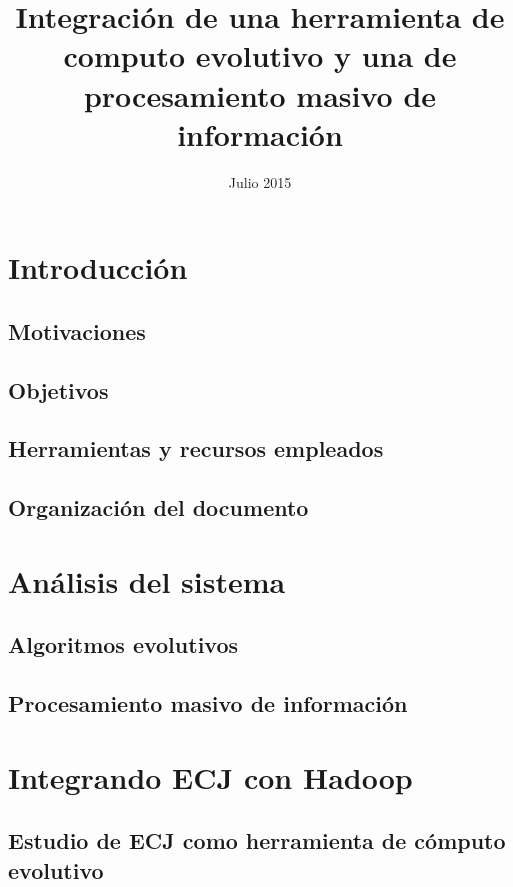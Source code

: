 \documentclass{estilos-y-libreria}
\title{Integración de una herramienta de computo evolutivo y una de procesamiento masivo de informaci\'on}
\date{Julio 2015}
\begin{document}
\frontmatter
\hacerportada
\hacercontraportada
\newpage{\ }
\thispagestyle{empty} 
\hacerprologo
\haceragradecimientos
\setcounter{secnumdepth}{2}
\setcounter{tocdepth}{2}
\tableofcontents
\listoffigures
\listoftables

\mainmatter

\chapter{Introducci\'on}\label{introduccion}
	\section{Motivaciones\label{motivaciones}}
		
	\section{Objetivos}
		
	\section{Herramientas y recursos empleados}
		
	\section{Organizaci\'on del documento}
			

\chapter{An\'alisis del sistema}\label{analisis}
	
	\section{Algoritmos evolutivos}
		
	\section{Procesamiento masivo de informaci\'on}
		

\chapter{Integrando ECJ con Hadoop}\label{integracion}
	
	\section{Estudio de ECJ como herramienta de c\'omputo evolutivo\label{desarrollo-ecj}}
		
\end{document}
